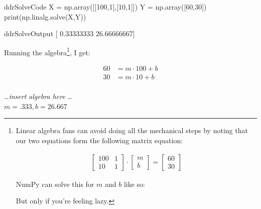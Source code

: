 
\begin{SaveVerbatim}{ddrSolveCode}
X = np.array([[100,1],[10,1]])
Y = np.array([60,30])
print(np.linalg.solve(X,Y))
\end{SaveVerbatim}
\begin{SaveVerbatim}{ddrSolveOutput}
[ 0.33333333 26.66666667]
\end{SaveVerbatim}
Running the algebra\footnote{Linear algebra fans can avoid doing all the
mechanical steps by noting that our two equations form the following matrix
equation:
\vspace{-.2in}

\begin{align*}
\begin{bmatrix} 100 & 1 \\ 10 & 1 \end{bmatrix}
\cdot
\begin{bmatrix} m \\ b \end{bmatrix}
=
\begin{bmatrix} 60 \\ 30 \end{bmatrix}
\end{align*}

NumPy can solve this for $m$ and $b$ like so:

\vspace{-.2in}

But only if you're feeling lazy. 
}, I get:
\begin{samepage}
\begin{align*}
60 &= m \cdot 100 + b\\
30 &= m \cdot 10 + b\\
\end{align*}
\vspace{-.7in}
\begin{center}
\dots \textit{insert algebra here} \dots \\
\smallskip
$m = .333, b = 26.667$
\end{center}
\end{samepage}

